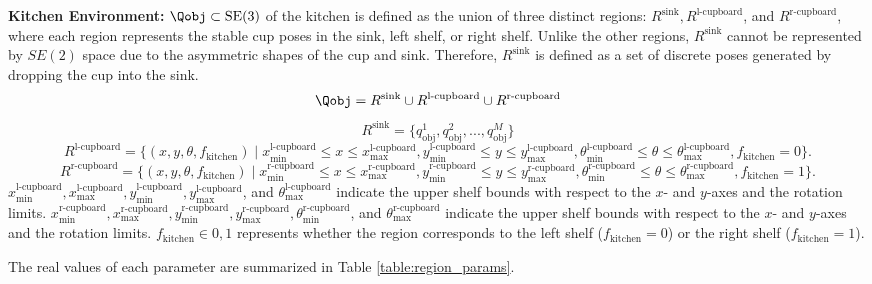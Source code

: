 \textbf{Kitchen Environment:} \label{env:bookshelf_region_descript} \(\Qobj \subset \text{SE(3)}\) of the kitchen is defined as the union of three distinct regions: $R^\text{sink}, R^\text{l-cupboard}$, and $R^\text{r-cupboard}$, where each region represents the stable cup poses in the sink, left shelf, or right shelf. Unlike the other regions, $R^\text{sink}$ cannot be represented by $SE(2)$ space due to the asymmetric shapes of the cup and sink. Therefore, $R^\text{sink}$ is defined as a set of discrete poses generated by dropping the cup into the sink.
\[
\Qobj = R^\text{sink} \cup R^\text{l-cupboard} \cup R^\text{r-cupboard}
\]
\[
R^\text{sink}=\{q^1_{\text{obj}}, q^2_{\text{obj}}, ..., q^M_{\text{obj}}\}
\]
\[
R^\text{l-cupboard} = \{(x, y, \theta, f_{\text{kitchen}}) \mid 
x^{\text{l-cupboard}}_{\text{min}} \le x \le x^{\text{l-cupboard}}_{\text{max}}, 
y^{\text{l-cupboard}}_{\text{min}} \le y \le y^{\text{l-cupboard}}_{\text{max}}, 
\theta^{\text{l-cupboard}}_{\text{min}} \le \theta \le \theta^{\text{l-cupboard}}_{\text{max}}, f_{\text{kitchen}}=0\}.
\]
\[
R^\text{r-cupboard} = \{(x, y, \theta, f_{\text{kitchen}}) \mid 
x^{\text{r-cupboard}}_{\text{min}} \le x \le x^{\text{r-cupboard}}_{\text{max}}, 
y^{\text{r-cupboard}}_{\text{min}} \le y \le y^{\text{r-cupboard}}_{\text{max}}, 
\theta^{\text{r-cupboard}}_{\text{min}} \le \theta \le \theta^{\text{r-cupboard}}_{\text{max}}, f_{\text{kitchen}}=1\}.
\]
$x^{\text{l-cupboard}}_{\text{min}}, x^{\text{l-cupboard}}_{\text{max}}, y^{\text{l-cupboard}}_{\text{min}}, y^{\text{l-cupboard}}_{\text{max}}$, and $\theta^{\text{l-cupboard}}_{\text{max}}$ indicate the upper shelf bounds with respect to the $x$- and $y$-axes and the rotation limits. $x^{\text{r-cupboard}}_{\text{min}}, x^{\text{r-cupboard}}_{\text{max}}, y^{\text{r-cupboard}}_{\text{min}}, y^{\text{r-cupboard}}_{\text{max}}, \theta^{\text{r-cupboard}}_{\text{min}}$, and $\theta^{\text{r-cupboard}}_{\text{max}}$ indicate the upper shelf bounds with respect to the $x$- and $y$-axes and the rotation limits. $f_{\text{kitchen}} \in {0, 1}$ represents whether the region corresponds to the left shelf ($f_{\text{kitchen}} = 0$) or the right shelf ($f_{\text{kitchen}} = 1$).

The real values of each parameter are summarized in Table \ref{table:region_params}.

